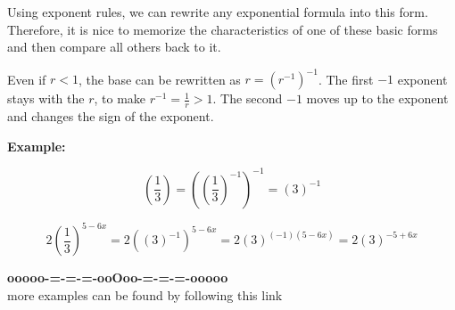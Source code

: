 \documentclass{ximera}
\begin{document}
Using exponent rules, we can rewrite any exponential formula into this form.  Therefore, it is nice to memorize the characteristics of one of these basic forms and then compare all others back to it. 




Even if $r<1$, the base can be rewritten as $r = (r^{-1})^{-1}$. The first $-1$ exponent stays with the $r$, to make $r^{-1}= \frac{1}{r} > 1$.  The second $-1$ moves up to the exponent and changes the sign of the exponent.


\textbf{Example:}  

\[
\left( \frac{1}{3} \right) = \left( \left( \frac{1}{3} \right)^{-1} \right)^{-1} = ( 3 )^{-1}
\]

\[
2 \left( \frac{1}{3} \right)^{5-6x} = 2 \left( ( 3 )^{-1} \right)^{5-6x} = 2 (3)^{(-1)(5-6x)} =  2 (3)^{-5+6x}
\]















\begin{center}
\textbf{\textcolor{green!50!black}{ooooo-=-=-=-ooOoo-=-=-=-ooooo}} \\

more examples can be found by following this link\\ 

\end{center}
\end{document}
